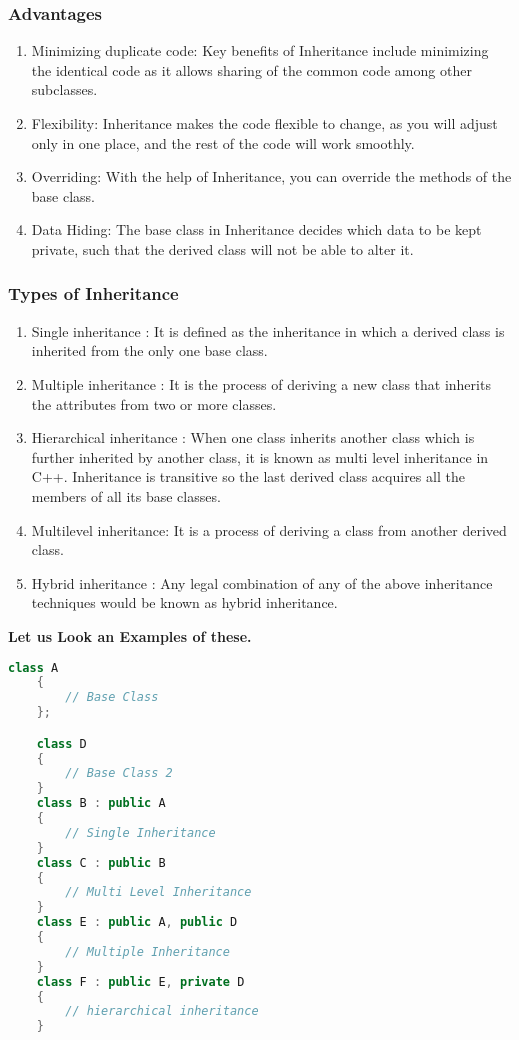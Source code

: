 \documentclass[11pt]{article}
\begin{document}
\subsubsection{Advantages}
\begin{enumerate}
	\item Minimizing duplicate code: Key benefits of Inheritance include minimizing the identical code as it allows sharing of the common code among other subclasses.

	\item Flexibility: Inheritance makes the code flexible to change, as you will adjust only in one place, and the rest of the code will work smoothly.

	\item Overriding: With the help of Inheritance, you can override the methods of the base class.

	\item Data Hiding: The base class in Inheritance decides which data to be kept private, such that the derived class will not be able to alter it.
\end{enumerate}

\subsubsection{Types of Inheritance}

\begin{enumerate}
	\item Single inheritance :
	      It is defined as the inheritance in which a derived class is inherited from the only one base class.
	\item Multiple inheritance : It is the process of deriving a new class that inherits the attributes from two or more classes.
	\item Hierarchical inheritance : When one class inherits another class which is further inherited by another class, it is known as multi level inheritance in C++. Inheritance is transitive so the last derived class acquires all the members of all its base classes.
	\item Multilevel inheritance: It is a process of deriving a class from another derived class.
	\item Hybrid inheritance : Any legal combination of any of the above inheritance techniques would be known as hybrid inheritance.
\end{enumerate}

\textbf{Let us Look an Examples of these.}
\begin{lstlisting}[language = C++]
	class A
	{
		// Base Class
	};

	class D
	{
		// Base Class 2
	}
	class B : public A
	{
		// Single Inheritance
	}
	class C : public B
	{
		// Multi Level Inheritance
	}
	class E : public A, public D
	{
		// Multiple Inheritance
	}
	class F : public E, private D
	{
		// hierarchical inheritance
	}
\end{lstlisting}
\end{document}
